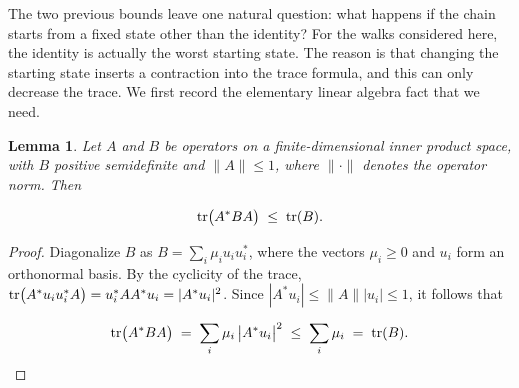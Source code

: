 \documentclass[11pt]{article}
\theoremstyle{plain}  %
\newtheorem{corollary}[theorem]{Corollary}
\newtheorem{lemma}[theorem]{Lemma}
\begin{document}
The two previous bounds leave one natural question: what happens if the chain starts from a
fixed state other than the identity? For the walks considered here, the identity is
actually the worst starting state. The reason is that changing the starting state inserts
a contraction into the trace formula, and this can only decrease the trace. We first
record the elementary linear algebra fact that we need.

\begin{lemma}\label{lem:trace}
Let $A$ and $B$ be operators on a finite-dimensional inner product space, with
$B$ positive semidefinite and $\|A\| \le 1$, where $\|\cdot\|$ denotes the
operator norm. Then

$$
  \tr\bigl(A^{*}BA\bigr) \;\le\; \tr(B).
$$

\end{lemma}

\begin{proof}
Diagonalize $B$ as
$B = \sum_i \mu_i u_iu_i^{*}$, where the vectors $\mu_i \ge 0$ and ${u_i}$ form an orthonormal basis. By the cyclicity of the trace,
$\tr\bigl(A^{*}u_iu_i^{*}A\bigr) = u_i^{*}AA^{*}u_i = |A^{*}u_i|^{2}$.
Since $|A^{*}u_i| \le \|A\||u_i| \le 1$, it follows that

\[
  \tr\bigl(A^{*}BA\bigr)
  \;=\; \sum_i \mu_i\,\bigl|A^{*}u_i\bigr|^{2}
  \;\le\; \sum_i \mu_i
  \;=\; \tr(B). \qedhere
\]

\end{proof}



\end{document}
